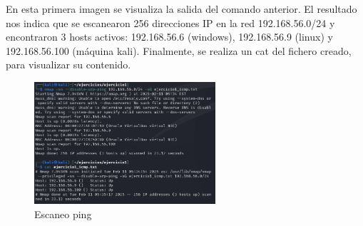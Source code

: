 \documentclass[a4paper,12pt]{article} %
\begin{document}
    En esta primera imagen se visualiza la salida del comando anterior. El resultado nos indica que se escanearon 256 direcciones IP en la red 192.168.56.0/24 y encontraron 3 hosts activos: 192.168.56.6 (windows), 192.168.56.9 (linux) y 192.168.56.100 (máquina kali). Finalmente, se realiza un cat del fichero creado, para visualizar su contenido.
    
        \begin{figure} [hp!]
         \centering
         \includegraphics[width=0.6\textwidth]{Imagenes/nmap.png}
         \caption{Escaneo ping}
         \label{fig:nmapD}
        \end{figure}
\end{document}
